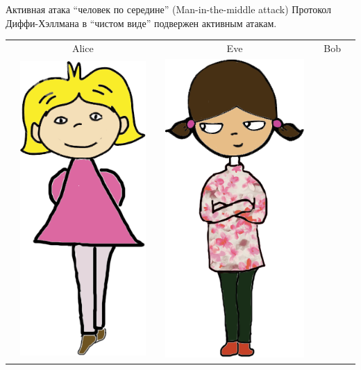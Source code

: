 \documentclass[usenames,dvipsnames,8pt,aspectratio=169]{beamer}
\begin{document}
\begin{frame}{Активная атака ``человек по середине'' (Man-in-the-middle attack)}
\Large
Протокол Диффи-Хэллмана в ``чистом виде'' подвержен {\color{Orange} активным} атакам.


\large
\begin{center}
	\begin{tabular}{l c c c c c l}
		& Alice  & & Eve & & Bob &  \\
		& \multirow{5}{*}{\includegraphics[scale=0.10]{Alice}} & & 
		\multirow{5}{*}{\includegraphics[scale=0.10]{Eve}} & &

\end{tabular}
\end{center}
\end{frame}
\end{document}
